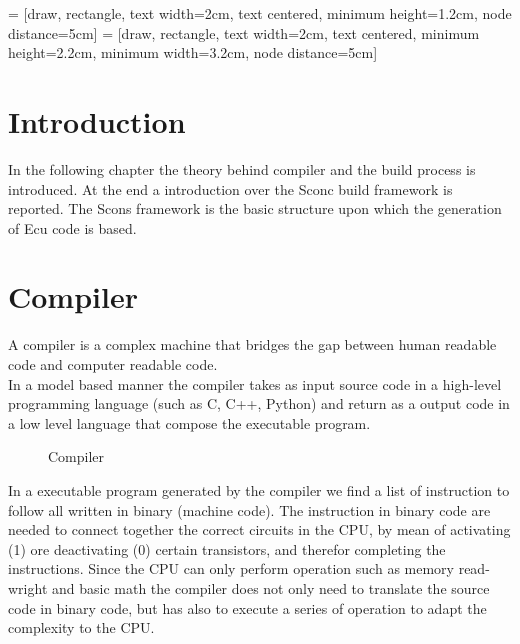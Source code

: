 \documentclass[../main.tex]{subfiles}
\begin{document}
 = [draw, rectangle, text width=2cm, text centered, minimum height=1.2cm, node distance=5cm]
 = [draw, rectangle, text width=2cm, text centered, minimum height=2.2cm, minimum width=3.2cm, node distance=5cm]

\section{Introduction}
In the following chapter the theory behind compiler and the build process is introduced. At the end a introduction over the Sconc build framework is reported. The Scons framework is the basic structure upon which the generation of Ecu code is based. 

\section{Compiler}
A compiler is a complex machine that bridges the gap between human readable code and computer readable code.\\
In a model based manner the compiler takes as input source code in a high-level programming language (such as C, C++, Python) and return as a output code in a low level language that compose the executable program. 
\begin{figure}[H]
  \centering
{}
    \caption{Compiler}
    \label{fig:compiler}
\end{figure}
In a executable program generated by the compiler we find a list of instruction to follow all written in binary (machine code). The instruction in binary code are needed to connect together the correct circuits in the CPU, by mean of activating (1) ore deactivating (0) certain transistors, and therefor completing the instructions. Since the CPU can only perform operation such as memory read-wright and basic math the compiler does not only need to translate the source code in binary code, but has also to execute a series of operation to adapt the complexity to the CPU. 
\cleardoublepage
\end{document}
